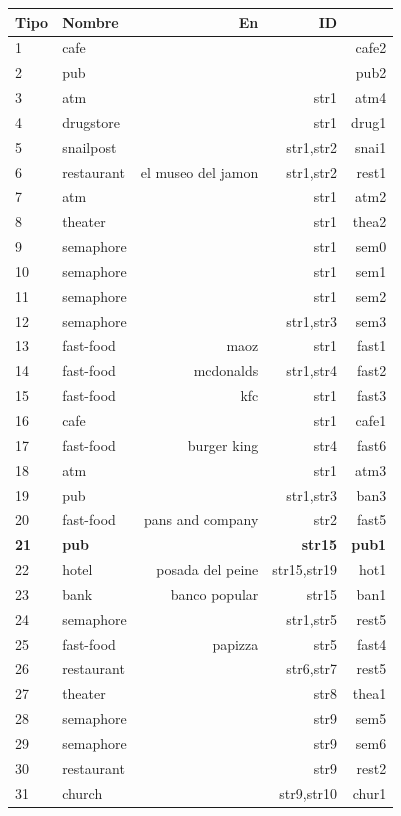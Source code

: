 \begin{table}[!t]
{\footnotesize
\begin{center}
\begin{tabular}{|l|l|r|r|r|}
\hline
Tipo & Nombre & En & ID\\
\hline

1&cafe & & & cafe2 \\
2&pub	& & & pub2 \\
3&atm	& & str1 & atm4 \\
4&drugstore & & str1 & drug1\\
5&snailpost & & str1,str2 & snai1\\
6&restaurant & el museo del jamon & str1,str2 & rest1\\
7&atm	& & str1 & atm2\\
8&theater & & str1 & thea2\\
9&semaphore & & str1 & sem0\\
10&semaphore & & str1 & sem1\\
11&semaphore & & str1 & sem2\\
12&semaphore & & str1,str3 & sem3\\
13&fast-food & maoz & str1 & fast1\\
14&fast-food & mcdonalds & str1,str4 & fast2\\
15&fast-food & kfc & str1 & fast3\\
16&cafe & & str1 & cafe1\\
17&fast-food & burger king & str4 & fast6\\
18&atm	& & str1 & atm3\\
19&pub	& & str1,str3 & ban3\\
20&fast-food & pans and company & str2 & fast5\\
\textbf{21}&\textbf{pub}	& & \textbf{str15} & \textbf{pub1}\\
22&hotel & posada del peine & str15,str19 & hot1\\
23&bank & banco popular & str15 & ban1\\
24&semaphore & & str1,str5 & rest5\\
25&fast-food & papizza & str5 & fast4\\
26&restaurant	& & str6,str7 & rest5\\
27&theater	& & str8 & thea1\\
28&semaphore & & str9 & sem5\\
29&semaphore & & str9 & sem6\\
30&restaurant & & str9 & rest2\\
31&church	& & str9,str10 & chur1\\

\end{tabular}
\end{center}}
\end{table}
